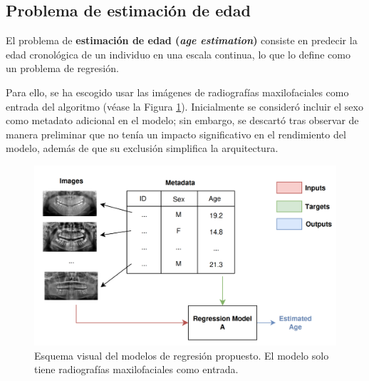 
\subsection{Problema de estimación de edad}

El problema de \textbf{estimación de edad (\textit{age estimation})} consiste en predecir la edad cronológica de un individuo en una escala continua, lo que lo define como un problema de regresión.

Para ello, se ha escogido usar las imágenes de radiografías maxilofaciales como entrada del algoritmo (véase la Figura \ref{fig:regression_problems}). Inicialmente se consideró incluir el sexo como metadato adicional en el modelo; sin embargo, se descartó tras observar de manera preliminar que no tenía un impacto significativo en el rendimiento del modelo, además de que su exclusión simplifica la arquitectura. 


\begin{figure}[h]
    \centering
    \includegraphics[width=\textwidth]{capitulos/cap_04/imagenes/regression_problem.png}
    \caption[
        Esquema visual del modelos de regresión propuesto. 
    ]{
        Esquema visual del modelos de regresión propuesto. 
        El modelo solo tiene radiografías maxilofaciales como entrada. 
    } 
    \label{fig:regression_problems}
\end{figure}



